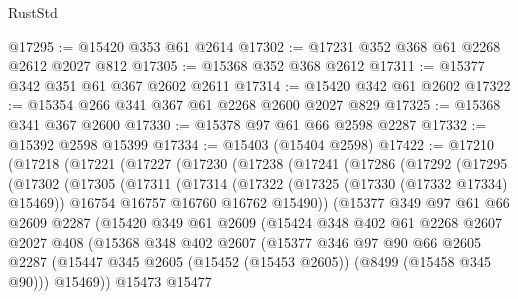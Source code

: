 \begin{lexlean}{RustStd}
\begin{coremodule}
@17295 := @15420 @353 @61 @2614
@17302 := @17231 @352 @368 @61 @2268 @2612 @2027 @812
@17305 := @15368 @352 @368 @2612
@17311 := @15377 @342 @351 @61 @367 @2602 @2611
@17314 := @15420 @342 @61 @2602
@17322 := @15354 @266 @341 @367 @61 @2268 @2600 @2027 @829
@17325 := @15368 @341 @367 @2600
@17330 := @15378 @97 @61 @66 @2598 @2287
@17332 := @15392 @2598 @15399
@17334 := @15403 (@15404 @2598)
@17422 := @17210
    (@17218
      (@17221
        (@17227
          (@17230
            (@17238
              (@17241
                (@17286
                  (@17292
                    (@17295
                      (@17302
                        (@17305
                          (@17311
                            (@17314
                              (@17322
                                (@17325 (@17330 (@17332 @17334) @15469))
                                @16754
                                @16757
                                @16760
                                @16762
                                @15490))
                            (@15377
                              @349
                              @97
                              @61
                              @66
                              @2609
                              @2287
                              (@15420
                                @349
                                @61
                                @2609
                                (@15424
                                  @348
                                  @402
                                  @61
                                  @2268
                                  @2607
                                  @2027
                                  @408
                                  (@15368
                                    @348
                                    @402
                                    @2607
                                    (@15377
                                      @346
                                      @97
                                      @90
                                      @66
                                      @2605
                                      @2287
                                      (@15447
                                        @345
                                        @2605
                                        (@15452 (@15453 @2605))
                                        (@8499 (@15458 @345 @90)))
                                      @15469))
                                  @15473
                                  @15477

\end{coremodule}
\end{lexlean}

